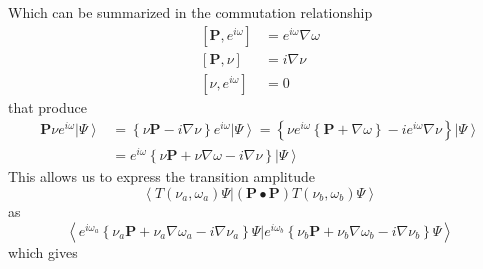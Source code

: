 \documentclass[aps,preprint]{revtex4}%
\begin{document}
Which can be summarized in the commutation relationship
\begin{align}
\left[  \mathbf{P,}e^{i\omega}\right]   &  =e^{i\omega}\nabla\omega\nonumber\\
\left[  \mathbf{P,}\nu\right]   &  =i\nabla\nu\nonumber\\
\left[  \nu,e^{i\omega}\right]   &  =0
\end{align}
that produce
\begin{align}
\mathbf{P}\nu e^{i\omega}\left\vert \Psi\right\rangle  &  =\left\{
\nu\mathbf{P}-i\nabla\nu\right\}  e^{i\omega}\left\vert \Psi\right\rangle
=\left\{  \nu e^{i\omega}\left\{  \mathbf{P}+\nabla\omega\right\}
-ie^{i\omega}\nabla\nu\right\}  \left\vert \Psi\right\rangle \nonumber\\
&  =e^{i\omega}\left\{  \nu\mathbf{P+}\nu\nabla\omega-i\nabla\nu\right\}
\left\vert \Psi\right\rangle
\end{align}
This allows us to express the transition amplitude%
\begin{equation}
\left\langle T\left(  \nu_{a},\omega_{a}\right)  \Psi|\left(  \mathbf{P\bullet
P}\right)  T\left(  \nu_{b},\omega_{b}\right)  \Psi\right\rangle
\end{equation}
as
\begin{equation}
\left\langle e^{i\omega_{a}}\left\{  \nu_{a}\mathbf{P+}\nu_{a}\nabla\omega
_{a}-i\nabla\nu_{a}\right\}  \Psi|e^{i\omega_{b}}\left\{  \nu_{b}%
\mathbf{P+}\nu_{b}\nabla\omega_{b}-i\nabla\nu_{b}\right\}  \Psi\right\rangle
\end{equation}
which gives
\end{document}
